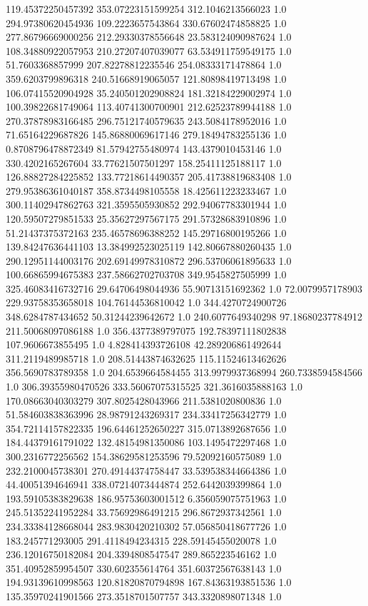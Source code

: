 119.45372250457392	353.07223151599254	312.1046213566023	1.0
294.97380620454936	109.2223657543864	330.67602474858825	1.0
277.86796669000256	212.29330378556648	23.583124090987624	1.0
108.34880922057953	210.27207407039077	63.534911759549175	1.0
51.7603368857999	207.82278812235546	254.08333171478864	1.0
359.6203799896318	240.51668919065057	121.80898419713498	1.0
106.07415520904928	35.240501202908824	181.32184229002974	1.0
100.39822681749064	113.40741300700901	212.62523789944188	1.0
270.37878983166485	296.75121740579635	243.5084178952016	1.0
71.65164229687826	145.86880069617146	279.18494783255136	1.0
0.8708796478872349	81.57942755480974	143.4379010453146	1.0
330.4202165267604	33.77621507501297	158.25411125188117	1.0
126.88827284225852	133.77218614490357	205.41738819683408	1.0
279.95386361040187	358.8734498105558	18.425611223233467	1.0
300.11402947862763	321.3595505930852	292.94067783301944	1.0
120.59507279851533	25.35627297567175	291.57328683910896	1.0
51.21437375372163	235.46578696388252	145.29716800195266	1.0
139.84247636441103	13.384992523025119	142.80667880260435	1.0
290.12951144003176	202.69149978310872	296.53706061895633	1.0
100.66865994675383	237.58662702703708	349.9545827505999	1.0
325.46083416732716	29.64706498044936	55.90713151692362	1.0
72.0079957178903	229.93758353658018	104.76144536810042	1.0
344.4270724900726	348.6284787434652	50.31244239642672	1.0
240.6077649340298	97.18680237784912	211.50068097086188	1.0
356.4377389797075	192.78397111802838	107.9606673855495	1.0
4.828414393726108	42.289206861492644	311.2119489985718	1.0
208.51443874632625	115.11524613462626	356.5690783789358	1.0
204.6539664584455	313.9979937368994	260.7338594584566	1.0
306.39355980470526	333.56067075315525	321.3616035888163	1.0
170.08663040303279	307.8025428043966	211.5381020800836	1.0
51.584603838363996	28.98791243269317	234.33417256342779	1.0
354.72114157822335	196.64461252650227	315.0713892687656	1.0
184.44379161791022	132.48154981350086	103.1495472297468	1.0
300.2316772256562	154.38629581253596	79.52092160575089	1.0
232.2100045738301	270.49144374758447	33.539538344664386	1.0
44.40051394646941	338.07214073444874	252.6442039399864	1.0
193.59105383829638	186.95753603001512	6.356059075751963	1.0
245.51352241952284	33.75692986491215	296.8672937342561	1.0
234.33384128668044	283.9830420210302	57.056850418677726	1.0
183.245771293005	291.4118494234315	228.59145455020078	1.0
236.12016750182084	204.3394808547547	289.865223546162	1.0
351.40952859954507	330.602355614764	351.60372567638143	1.0
194.93139610998563	120.81820870794898	167.84363193851536	1.0
135.35970241901566	273.3518701507757	343.3320898071348	1.0
